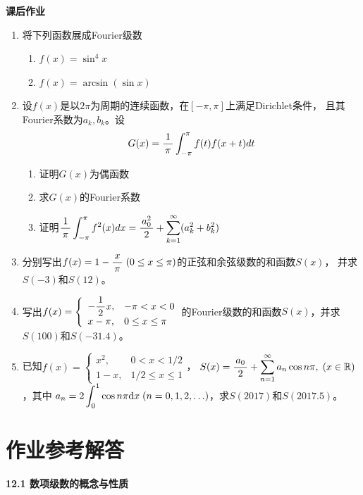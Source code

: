 \begin{ext}
	{\bf 课后作业}
	\begin{enumerate}
	  \item 将下列函数展成Fourier级数
		\begin{enumerate}[(1)]
		  \item $f(x)=\sin^4x$
		  \item $f(x)=\arcsin(\sin x)$
		\end{enumerate}
	  \item 设$f(x)$是以$2\pi$为周期的连续函数，在$[-\pi,\pi]$上满足Dirichlet条件，
		且其Fourier系数为$a_k,b_k$。设
		$$G(x)=\displaystyle\frac{\,{1}\,}{\,{\pi}\,}\displaystyle\int_{-\pi}^{\pi}f(t)f(x+t)dt$$
		\begin{enumerate}[(1)]
		  \item 证明$G(x)$为偶函数
		  \item 求$G(x)$的Fourier系数
		  \item 证明$\displaystyle\frac{\,{1}\,}{\,{\pi}\,}\displaystyle\int_{-\pi}^{\pi}f^2(x)dx=\displaystyle\frac{\,{a_0^2}\,}{\,{2}\,}+
		  \sum\limits_{k=1}^{\infty}(a_k^2+b_k^2)$
		\end{enumerate}
	  \item 分别写出$f(x)=1-\displaystyle\frac{\,{x}\,}{\,{\pi}\,}\;(0\leq x\leq\pi)$的正弦和余弦级数的和函数$S(x)$，
		并求$S(-3)$和$S(12)$。
	  \item 写出$f(x)=\left\{\begin{array}{ll}
			-\displaystyle\frac{\,{1}\,}{\,{2}\,}x,&-\pi<x<0\\ x-\pi,&0\leq x\leq \pi
		\end{array}\right.$的Fourier级数的和函数$S(x)$，并求$S(100)$和$S(-31.4)$。
	  \item 已知$f(x)=\left\{\begin{array}{ll}
			x^2,&0<x<1/2\\ 1-x,&1/2\leq x\leq 1
		\end{array}\right.$，
		$S(x)=\displaystyle\frac{\,{a_0}\,}{\,{2}\,}+\sum\limits_{n=1}^{\infty} a_n\cos n\pi,\;(x\in\mathbb{R})$，其中
		$a_n=2\displaystyle\int_0^1\cos n\pi\mathrm{d} x\;(n=0,1,2,\ldots)$，求$S(2017)$和$S(2017.5)$。
	\end{enumerate}
\end{ext}

\newpage

\section*{作业参考解答}

\begin{center}
	\bf 12.1 数项级数的概念与性质
\end{center}

